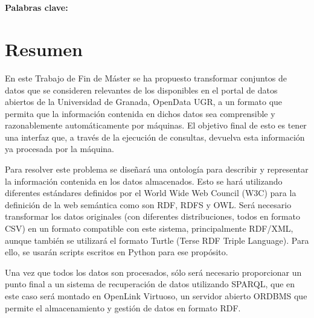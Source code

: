\begin{center}
{\LARGE\bfseries\titulo}\\
\end{center}
\begin{center}
\autor\
\end{center}

\textbf{Palabras clave: }{\keywordsEs}

\section*{Resumen}


En este {\sf Trabajo de Fin de Máster} se ha propuesto transformar conjuntos de datos que se consideren relevantes de los disponibles en el portal de datos abiertos de la {Universidad de Granada}, {\sf OpenData UGR}, a un formato que permita que la información contenida en dichos datos sea comprensible y razonablemente automáticamente por máquinas. El objetivo final de esto es tener una interfaz que, a través de la ejecución de consultas, devuelva esta información ya procesada por la máquina.

\bigskip
Para resolver este problema se diseñará una ontología para describir y representar la información contenida en los datos almacenados. Esto se hará utilizando diferentes estándares definidos por el {\sf World Wide Web Council (W3C)} para la definición de la web semántica como son {\sf RDF}, {\sf RDFS} y {\sf OW}L. Será necesario transformar los datos originales (con diferentes distribuciones, todos en formato {\sf CSV}) en un formato compatible con este sistema, principalmente {\sf RDF/XML}, aunque también se utilizará el formato {\sf Turtle (Terse RDF Triple Language)}. Para ello, se usarán scripts escritos en {\sf Python} para ese propósito.

\bigskip
Una vez que todos los datos son procesados, sólo será necesario proporcionar un punto final a un sistema de recuperación de datos utilizando {\sf SPARQL}, que en este caso será montado en {\sf OpenLink Virtuoso}, un servidor abierto {\sf ORDBMS} que permite el almacenamiento y gestión de datos en formato {\sf RDF}.

\newpage
\begin{center}
{\LARGE\bfseries\tituloEng}\\
\end{center}
\begin{center}
\autor\
\end{center}


